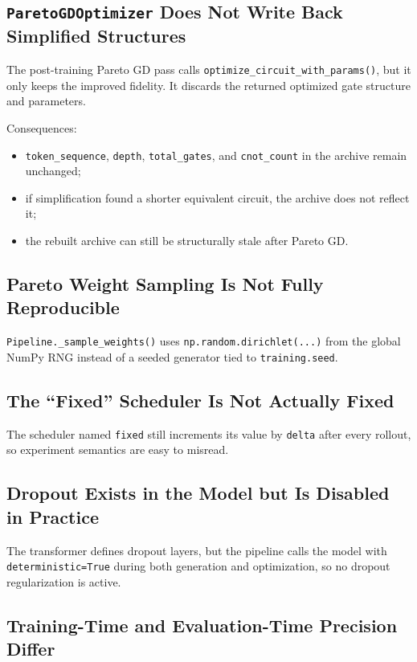 \documentclass[11pt]{article}
\begin{document}
\subsection{\texttt{ParetoGDOptimizer} Does Not Write Back Simplified Structures}

The post-training Pareto GD pass calls \texttt{optimize\_circuit\_with\_params()}, but it only keeps the improved fidelity. It discards the returned optimized gate structure and parameters.

Consequences:

\begin{itemize}[leftmargin=*]
\item \texttt{token\_sequence}, \texttt{depth}, \texttt{total\_gates}, and \texttt{cnot\_count} in the archive remain unchanged;
\item if simplification found a shorter equivalent circuit, the archive does not reflect it;
\item the rebuilt archive can still be structurally stale after Pareto GD.
\end{itemize}

\subsection{Pareto Weight Sampling Is Not Fully Reproducible}

\texttt{Pipeline.\_sample\_weights()} uses \texttt{np.random.dirichlet(...)} from the global NumPy RNG instead of a seeded generator tied to \texttt{training.seed}.

\subsection{The ``Fixed'' Scheduler Is Not Actually Fixed}

The scheduler named \texttt{fixed} still increments its value by \texttt{delta} after every rollout, so experiment semantics are easy to misread.

\subsection{Dropout Exists in the Model but Is Disabled in Practice}

The transformer defines dropout layers, but the pipeline calls the model with \texttt{deterministic=True} during both generation and optimization, so no dropout regularization is active.

\subsection{Training-Time and Evaluation-Time Precision Differ}
\end{document}
